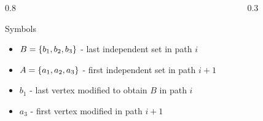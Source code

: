 \begin{frame}{}
\begin{columns}
    \begin{column}{0.8\textwidth}
        \begin{heading}{Symbols}
            \begin{itemize}
                \item \(B=\left\{ b_1,b_2,b_3 \right\}\) - last independent set in path \(i\)
                \item \(A=\left\{ a_1,a_2,a_3 \right\}\) - first independent set in path \(i+1\)
                \item \(b_1\) - last vertex modified to obtain \(B\) in path \(i\)
                \item \(a_3\) - first vertex modified in path \(i+1\)
            \end{itemize}
        \end{heading}
    \end{column}
    \begin{column}{0.3\textwidth}
        \begin{figure}
            \centering
            
        \end{figure}
    \end{column}
\end{columns}
\end{frame}


